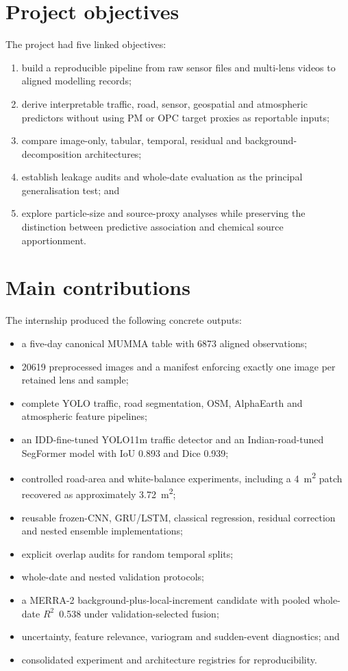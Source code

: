 \documentclass[11pt,a4paper,oneside]{report}
\newcommand{\Rtwo}{$R^2$}
\begin{document}
\section{Project objectives}
The project had five linked objectives:
\begin{enumerate}
  \item build a reproducible pipeline from raw sensor files and multi-lens videos
        to aligned modelling records;
  \item derive interpretable traffic, road, sensor, geospatial and atmospheric
        predictors without using PM or OPC target proxies as reportable inputs;
  \item compare image-only, tabular, temporal, residual and background-decomposition
        architectures;
  \item establish leakage audits and whole-date evaluation as the principal
        generalisation test; and
  \item explore particle-size and source-proxy analyses while preserving the
        distinction between predictive association and chemical source
        apportionment.
\end{enumerate}

\section{Main contributions}
The internship produced the following concrete outputs:
\begin{itemize}
  \item a five-day canonical MUMMA table with \num{6873} aligned observations;
  \item \num{20619} preprocessed images and a manifest enforcing exactly one image
        per retained lens and sample;
  \item complete YOLO traffic, road segmentation, OSM, AlphaEarth and atmospheric
        feature pipelines;
  \item an IDD-fine-tuned YOLO11m traffic detector and an Indian-road-tuned
        SegFormer model with IoU 0.893 and Dice 0.939;
  \item controlled road-area and white-balance experiments, including a
        \SI{4}{\square\metre} patch recovered as approximately
        \SI{3.72}{\square\metre};
  \item reusable frozen-CNN, GRU/LSTM, classical regression, residual correction
        and nested ensemble implementations;
  \item explicit overlap audits for random temporal splits;
  \item whole-date and nested validation protocols;
  \item a MERRA-2 background-plus-local-increment candidate with pooled whole-date
        \Rtwo\ 0.538 under validation-selected fusion;
  \item uncertainty, feature relevance, variogram and sudden-event diagnostics;
        and
  \item consolidated experiment and architecture registries for reproducibility.
\end{itemize}
\end{document}
